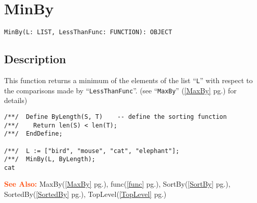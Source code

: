 \documentclass[a4paper]{mybook}
\newenvironment{command}{}{} %
\newcommand\SeeAlso{\par\textcolor{OrangeRed}{\textbf{\large See Also: }}}
\begin{document}
\section{MinBy}
\label{MinBy}
\begin{command} %


\begin{Verbatim}[label=syntax, rulecolor=\color{MidnightBlue},
frame=single]
MinBy(L: LIST, LessThanFunc: FUNCTION): OBJECT
\end{Verbatim}


\subsection*{Description}

This function returns a minimum of the elements of the list ``\verb&L&''
with respect to the comparisons made by ``\verb&LessThanFunc&''.
(see ``\verb&MaxBy&'' (\ref{MaxBy} pg.\pageref{MaxBy}) for details)
\begin{Verbatim}[label=example, rulecolor=\color{PineGreen}, frame=single]
/**/  Define ByLength(S, T)    -- define the sorting function
/**/    Return len(S) < len(T);
/**/  EndDefine;

/**/  L := ["bird", "mouse", "cat", "elephant"];
/**/  MinBy(L, ByLength);
cat
\end{Verbatim}


\SeeAlso %
  MaxBy(\ref{MaxBy} pg.\pageref{MaxBy}), 
    func(\ref{func} pg.\pageref{func}), 
    SortBy(\ref{SortBy} pg.\pageref{SortBy}), 
    SortedBy(\ref{SortedBy} pg.\pageref{SortedBy}), 
    TopLevel(\ref{TopLevel} pg.\pageref{TopLevel})
\end{command} %
\end{document}
